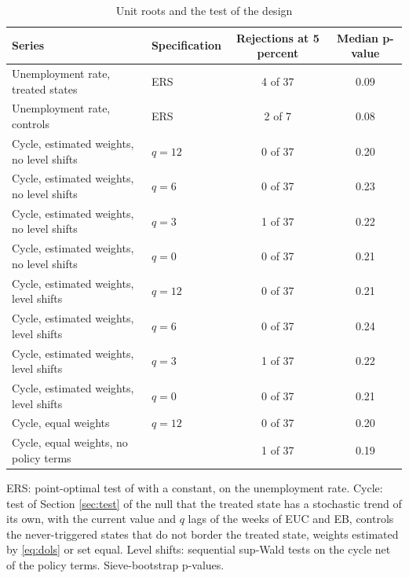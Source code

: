 \begin{table}[htbp]
\centering
\caption{Unit roots and the test of the design\label{tab:eb-tests}}
\small
\begin{tabular}{llcc}
\toprule
Series & Specification & Rejections at 5 percent & Median p-value \\
\midrule
Unemployment rate, treated states & ERS & 4 of 37 & 0.09 \\
Unemployment rate, controls & ERS & 2 of 7 & 0.08 \\
\midrule
Cycle, estimated weights, no level shifts & $q=12$ & 0 of 37 & 0.20 \\
Cycle, estimated weights, no level shifts & $q=6$ & 0 of 37 & 0.23 \\
Cycle, estimated weights, no level shifts & $q=3$ & 1 of 37 & 0.22 \\
Cycle, estimated weights, no level shifts & $q=0$ & 0 of 37 & 0.21 \\
Cycle, estimated weights, level shifts & $q=12$ & 0 of 37 & 0.21 \\
Cycle, estimated weights, level shifts & $q=6$ & 0 of 37 & 0.24 \\
Cycle, estimated weights, level shifts & $q=3$ & 1 of 37 & 0.22 \\
Cycle, estimated weights, level shifts & $q=0$ & 0 of 37 & 0.21 \\
\midrule
Cycle, equal weights & $q=12$ & 0 of 37 & 0.20 \\
Cycle, equal weights, no policy terms & & 1 of 37 & 0.19 \\
\bottomrule
\end{tabular}
\par\smallskip\parbox{0.95\textwidth}{\footnotesize ERS: point-optimal test of \citet{ERS1996} with a constant, on the unemployment rate. Cycle: test of Section \ref{sec:test} of the null that the treated state has a stochastic trend of its own, with the current value and $q$ lags of the weeks of EUC and EB, controls the never-triggered states that do not border the treated state, weights estimated by \eqref{eq:dols} or set equal. Level shifts: sequential sup-Wald tests on the cycle net of the policy terms. Sieve-bootstrap p-values.}
\end{table}
